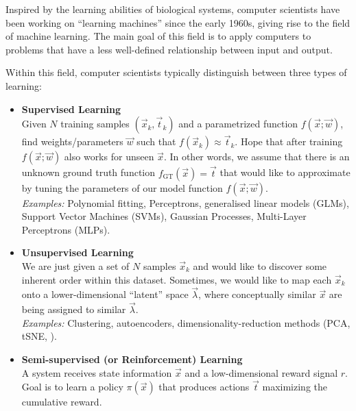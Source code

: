 \documentclass[10pt,letterpaper,oneside]{article}
\begin{document}
Inspired by the learning abilities of biological systems, computer scientists have been working on \enquote{learning machines} since the early 1960s, giving rise to the field of machine learning. The main goal of this field is to apply computers to problems that have a less well-defined relationship between input and output.


Within this field, computer scientists typically distinguish between three types of learning:
\begin{itemize}
	\item \textbf{Supervised Learning}\\
	Given $N$ training samples $(\vec x_k, \vec t_k)$ and a parametrized function $f(\vec x; \vec w)$, find weights/parameters $\vec w$ such that $f(\vec x_k) \approx \vec t_k$. Hope that after training $f(\vec x; \vec w)$ also works for unseen $\vec x$. In other words, we assume that there is an unknown ground truth function $f_\mathrm{GT}(\vec x) = \vec t$ that would like to approximate by tuning the parameters of our model function $f(\vec x; \vec w)$.\\
	\emph{Examples:} Polynomial fitting, Perceptrons, generalised linear models (GLMs), Support Vector Machines (SVMs), Gaussian Processes, Multi-Layer Perceptrons (MLPs).
	\item \textbf{Unsupervised Learning}\\
	We are just given a set of $N$ samples $\vec x_k$ and would like to discover some inherent order within this dataset. Sometimes, we would like to map each $\vec x_k$ onto a lower-dimensional \enquote{latent} space $\vec \lambda$, where conceptually similar $\vec x$ are being assigned to similar $\vec \lambda$.\\
	\emph{Examples:} Clustering, autoencoders, dimensionality-reduction methods (PCA, tSNE, \textellipsis).
	\item \textbf{Semi-supervised (or Reinforcement) Learning}\\
	A system receives state information $\vec x$ and a low-dimensional reward signal $r$. Goal is to learn a policy $\pi(\vec x)$ that produces actions $\vec t$ maximizing the cumulative reward.
\end{itemize}
\end{document}
